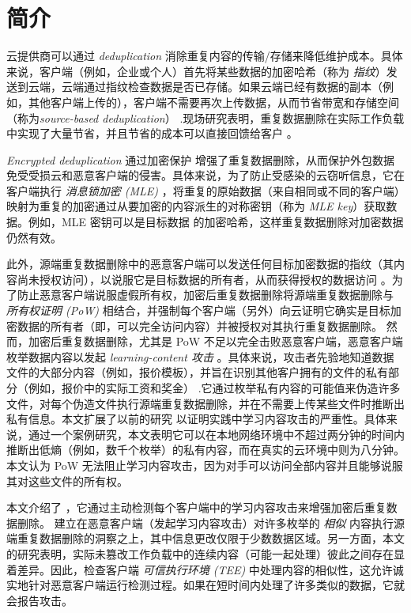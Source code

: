 \section{简介}
\label{sec:featurespy-intro}

云提供商可以通过 {\em deduplication} \cite{harnik10} 消除重复内容的传输/存储来降低维护成本。具体来说，客户端（例如，企业或个人）首先将某些数据的加密哈希（称为 {\em 指纹}）发送到云端，云端通过指纹检查数据是否已存储。如果云端已经有数据的副本（例如，其他客户端上传的），客户端不需要再次上传数据，从而节省带宽和存储空间（称为{\em source-based deduplication}） .现场研究表明，重复数据删除在实际工作负载 \cite{jin09, meyer11, wallace12} 中实现了大量节省，并且节省的成本可以直接回馈给客户 \cite{bellare2013DupLESS, armknecht2015transparent}。


{\em Encrypted deduplication} 通过加密保护 \cite{bellare2013MLE, halevi11} 增强了重复数据删除，从而保护外包数据免受受损云和恶意客户端的侵害。具体来说，为了防止受感染的云窃听信息，它在客户端执行 {\em 消息锁加密 (MLE)} \cite{bellare2013MLE}，将重复的原始数据（来自相同或不同的客户端）映射为重复的加密通过从要加密的内容派生的对称密钥（称为 {\em MLE key}）获取数据。例如，MLE 密钥可以是目标数据 \cite{douceur02} 的加密哈希，这样重复数据删除对加密数据仍然有效。

此外，源端重复数据删除中的恶意客户端可以发送任何目标加密数据的指纹（其内容尚未授权访问），以说服它是目标数据的所有者，从而获得授权的数据访问 \cite{ halevi11,mulazzani11}。为了防止恶意客户端说服虚假所有权，加密后重复数据删除将源端重复数据删除与 {\em 所有权证明 (PoW)} \cite{halevi11} 相结合，并强制每个客户端（另外）向云证明它确实是目标加密数据的所有者（即，可以完全访问内容）并被授权对其执行重复数据删除。
然而，加密后重复数据删除，尤其是 PoW 不足以完全击败恶意客户端，恶意客户端枚举数据内容以发起 {\em learning-content 攻击} \cite{harnik10, zuo2018mitigating}。具体来说，攻击者先验地知道数据文件的大部分内容（例如，报价模板），并旨在识别其他客户拥有的文件的私有部分（例如，报价中的实际工资和奖金） .它通过枚举私有内容的可能值来伪造许多文件，对每个伪造文件执行源端重复数据删除，并在不需要上传某些文件时推断出私有信息。本文扩展了以前的研究 \cite{harnik10, zuo2018mitigating} 以证明实践中学习内容攻击的严重性。具体来说，通过一个案例研究，本文表明它可以在本地网络环境中不超过两分钟的时间内推断出低熵（例如，数千个枚举）的私有内容，而在真实的云环境中则为八分钟。本文认为 PoW 无法阻止学习内容攻击，因为对手可以访问全部内容并且能够说服其对这些文件的所有权。


本文介绍了 \sysnameF，它通过主动检测每个客户端中的学习内容攻击来增强加密后重复数据删除。 \sysnameF 建立在恶意客户端（发起学习内容攻击）对许多枚举的 {\em 相似} 内容执行源端重复数据删除的洞察之上，其中信息更改仅限于少数数据区域。另一方面，本文的研究表明，实际未篡改工作负载中的连续内容（可能一起处理）彼此之间存在显着差异。因此，\sysnameF 检查客户端 {\em 可信执行环境 (TEE)} \cite{sgx} 中处理内容的相似性，这允许诚实地针对恶意客户端运行检测过程。如果在短时间内处理了许多类似的数据，它就会报告攻击。


